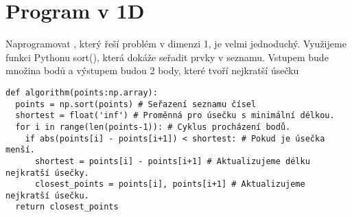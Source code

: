 \section{Program v 1D}
\label{sec:program_1D}
Naprogramovat , který řeší problém v dimenzi 1, je velmi jednoduchý. Využijeme funkci Pythonu sort(), která dokáže seřadit prvky v seznamu. Vstupem bude množina bodů a výstupem budou 2 body, které tvoří nejkratší úsečku

\begin{mdframed}[style=MyFrame]
\begin{lstlisting}[style=metoo]
def algorithm(points:np.array):
  points = np.sort(points) # Seřazení seznamu čísel
  shortest = float('inf') # Proměnná pro úsečku s minimální délkou.
  for i in range(len(points-1)): # Cyklus procházení bodů.
    if abs(points[i] - points[i+1]) < shortest: # Pokud je úsečka menší.
      shortest = points[i] - points[i+1] # Aktualizujeme délku nejkratší úsečky.
      closest_points = points[i], points[i+1] # Aktualizujeme nejkratší úsečku.
  return closest_points
\end{lstlisting}
\end{mdframed}
